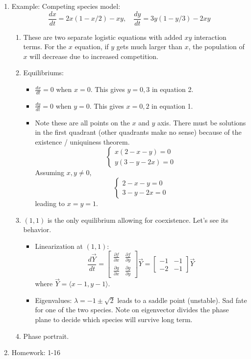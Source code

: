 \documentclass{article}
\begin{document}
\begin{enumerate}
\item Example: Competing species model:
\[
\frac{dx}{dt} = 2x(1-x/2)-xy, \quad \frac{dy}{dt}=3y(1-y/3)-2xy
\]
\begin{enumerate}
\item These are two separate logistic equations with added $xy$ interaction terms. For the $x$ equation, if $y$ gets much larger than $x$, the population of $x$ will decrease due to increased competition.
\item Equilibriums:
\begin{itemize}
\item $\frac{dx}{dt}=0$ when $x=0$. This gives $y=0,3$ in equation 2.
\item $\frac{dy}{dt}=0$ when $y=0$. This gives $x=0,2$ in equation 1.
\item Note these are all points on the $x$ and $y$ axis. There must be solutions in the first quadrant (other quadrants make no sense) because of the existence / uniquiness theorem. 
\[
\begin{cases}
x(2-x-y) = 0 \\
y(3-y-2x) = 0
\end{cases}
\]
Assuming $x,y \neq 0$, 
\[
\begin{cases}
2-x-y = 0 \\
3-y-2x = 0
\end{cases}
\]
leading to $x=y=1$.
\end{itemize}
\item $(1,1)$ is the only equilibrium allowing for coexistence. Let's see its behavior.
\begin{itemize}
\item Linearization at $(1,1)$:
\[
\frac{d\vec{Y}}{dt} = 
\begin{bmatrix}
\frac{\partial f}{\partial x} &\frac{\partial f}{\partial y}  \\
\frac{\partial g}{\partial x} &\frac{\partial g}{\partial y}  
\end{bmatrix} \vec{Y} 
=
\begin{bmatrix}
-1 & -1 \\
-2 & -1
\end{bmatrix} \vec{Y} 
\]
where $\vec{Y} = \langle x-1, y-1 \rangle$.
\item Eigenvalues: $\lambda = -1 \pm \sqrt{2}$ leads to a saddle point (unstable). Sad fate for one of the two species. Note on eigenvector divides the phase plane to decide which species will survive long term.
\end{itemize}
\item Phase portrait.
\end{enumerate}

\item Homework: 1-16

\end{enumerate}
\end{document}
